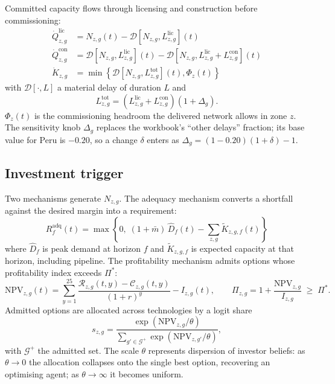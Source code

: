 \documentclass[11pt]{article}
\begin{document}
Committed capacity flows through licensing and construction before commissioning:
\begin{align}
  \dot{Q}^{\text{lic}}_{z,g} &= N_{z,g}(t) - \mathcal{D}\!\left[N_{z,g}, L^{\text{lic}}_{z,g}\right](t) \\
  \dot{Q}^{\text{con}}_{z,g} &= \mathcal{D}\!\left[N_{z,g}, L^{\text{lic}}_{z,g}\right](t)
     - \mathcal{D}\!\left[N_{z,g}, L^{\text{lic}}_{z,g}+L^{\text{con}}_{z,g}\right](t) \\
  \dot{K}_{z,g} &= \min\!\left\{\mathcal{D}\!\left[N_{z,g}, L^{\text{tot}}_{z,g}\right](t), \Phi_z(t)\right\}
\end{align}
with $\mathcal{D}[\cdot,L]$ a material delay of duration $L$ and
\begin{equation}
  L^{\text{tot}}_{z,g} = \left(L^{\text{lic}}_{z,g} + L^{\text{con}}_{z,g}\right)\left(1 + \Delta_g\right).
\end{equation}
$\Phi_z(t)$ is the commissioning headroom the delivered network allows in zone $z$.
The sensitivity knob $\Delta_g$ replaces the workbook's ``other delays'' fraction;
its base value for Peru is $-0.20$, so a change $\delta$ enters as
$\Delta_g = (1-0.20)(1+\delta) - 1$.

\subsection{Investment trigger}

Two mechanisms generate $N_{z,g}$. The adequacy mechanism converts a shortfall
against the desired margin into a requirement:
\begin{equation}
  R^{\text{adq}}_{f}(t) = \max\!\left\{0,\;
    (1+\bar m)\,\hat{D}_{f}(t) - \textstyle\sum_{z,g} \tilde{K}_{z,g,f}(t)\right\}
\end{equation}
where $\hat{D}_f$ is peak demand at horizon $f$ and $\tilde{K}_{z,g,f}$ is expected
capacity at that horizon, including pipeline. The profitability mechanism admits
options whose profitability index exceeds $\Pi^{*}$:
\begin{equation}
  \text{NPV}_{z,g}(t) = \sum_{y=1}^{25}
    \frac{\mathcal{R}_{z,g}(t,y) - \mathcal{C}_{z,g}(t,y)}{(1+r)^{y}} - I_{z,g}(t),
  \qquad
  \Pi_{z,g} = 1 + \frac{\text{NPV}_{z,g}}{I_{z,g}} \;\ge\; \Pi^{*}.
\end{equation}
Admitted options are allocated across technologies by a logit share
\begin{equation}
  s_{z,g} = \frac{\exp\!\left(\text{NPV}_{z,g}/\theta\right)}
                 {\sum_{g' \in \mathcal{G}^{+}} \exp\!\left(\text{NPV}_{z,g'}/\theta\right)},
\end{equation}
with $\mathcal{G}^{+}$ the admitted set. The scale $\theta$ represents dispersion of
investor beliefs: as $\theta \to 0$ the allocation collapses onto the single best
option, recovering an optimising agent; as $\theta \to \infty$ it becomes uniform.
\end{document}
